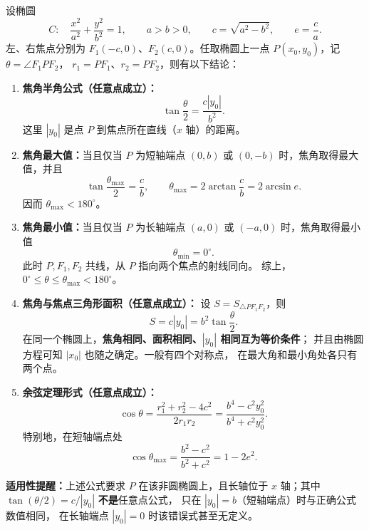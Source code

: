 \begin{statementbox}
设椭圆
\[
C:\quad \frac{x^2}{a^2}+\frac{y^2}{b^2}=1,
\qquad a>b>0,\qquad c=\sqrt{a^2-b^2},\qquad e=\frac ca.
\]
左、右焦点分别为 $F_1(-c,0)$、$F_2(c,0)$。任取椭圆上一点
$P(x_0,y_0)$，记 $\theta=\angle F_1PF_2$，
$r_1=PF_1$、$r_2=PF_2$，则有以下结论：
\begin{enumerate}
  \item \textbf{焦角半角公式（任意点成立）：}
  \[
  \boxed{\tan\frac{\theta}{2}=\frac{c|y_0|}{b^2}}.
  \]
  这里 $|y_0|$ 是点 $P$ 到焦点所在直线（$x$ 轴）的距离。

  \item \textbf{焦角最大值：}当且仅当 $P$ 为短轴端点
  $(0,b)$ 或 $(0,-b)$ 时，焦角取得最大值，并且
  \[
  \boxed{\tan\frac{\theta_{\max}}2=\frac cb},\qquad
  \boxed{\theta_{\max}=2\arctan\frac cb=2\arcsin e}.
  \]
  因而 $\theta_{\max}<180^\circ$。

  \item \textbf{焦角最小值：}当且仅当 $P$ 为长轴端点
  $(a,0)$ 或 $(-a,0)$ 时，焦角取得最小值
  \[
  \boxed{\theta_{\min}=0^\circ}.
  \]
  此时 $P,F_1,F_2$ 共线，从 $P$ 指向两个焦点的射线同向。
  综上，\(\boxed{0^\circ\leq\theta\leq\theta_{\max}<180^\circ}\)。

  \item \textbf{焦角与焦点三角形面积（任意点成立）：}
  设 $S=S_{\triangle PF_1F_2}$，则
  \[
  \boxed{S=c|y_0|=b^2\tan\frac{\theta}{2}}.
  \]
  在同一个椭圆上，\textbf{焦角相同、面积相同、$|y_0|$ 相同互为等价条件}；
  并且由椭圆方程可知 $|x_0|$ 也随之确定。一般有四个对称点，
  在最大角和最小角处各只有两个点。

  \item \textbf{余弦定理形式（任意点成立）：}
  \[
  \boxed{\cos\theta=\frac{r_1^2+r_2^2-4c^2}{2r_1r_2}
  =\frac{b^4-c^2y_0^2}{b^4+c^2y_0^2}}.
  \]
  特别地，在短轴端点处
  \[
  \boxed{\cos\theta_{\max}=\frac{b^2-c^2}{b^2+c^2}
  =1-2e^2}.
  \]
\end{enumerate}
\textbf{适用性提醒：}上述公式要求 $P$ 在该非圆椭圆上，且长轴位于
$x$ 轴；其中 $\tan(\theta/2)=c/|y_0|$ \textbf{不是}任意点公式，
只在 $|y_0|=b$（短轴端点）时与正确公式数值相同，
在长轴端点 $|y_0|=0$ 时该错误式甚至无定义。
\end{statementbox}
